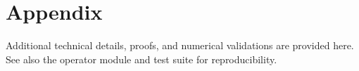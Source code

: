 \section{Appendix}
Additional technical details, proofs, and numerical validations are provided here. See also the operator module and test suite for reproducibility.
